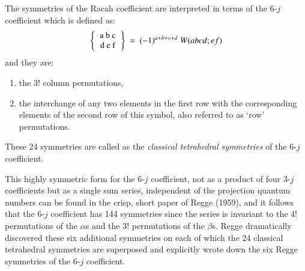 The symmetries of the Racah coefficient are interpreted in terms of the 6-$j$ coefficient which is defined as:
\begin{equation}
\left\{\begin{tabular} {c} 
a\ b\ c\\ 
d\ e\ f \\ 
\end{tabular} \right\} 
\ =\ (-1)^{a+b+c+d}\ W(abcd;ef) \label{chap7-eq28}
\end{equation}
and they are:
\begin{enumerate}
\item the 3! column permutations,
\item the interchange of any two elements in the first row with the corresponding elements of the second row of this symbol, also referred to as `row' permutations.
\end{enumerate}

These 24 symmetries are called as the \textit{classical tetrahedral symmetries} of the 6-$j$ coefficient.

This highly symmetric form for the 6-$j$ coefficient, not as a product of four 3-$j$ coefficients but as a single sum series, independent of the projection quantum numbers can be found in the crisp, short paper of Regge (1959), and it follows that the 6-$j$ coefficient has 144 symmetries since the series is invariant to the 4! permutations of the $\alpha$s and the 3! permutations of the $\beta$s. Regge dramatically discovered these six additional symmetries on each of which the 24 classical tetrahedral symmetries are superposed and explicitly wrote down the six Regge symmetries of the 6-$j$ coefficient.

